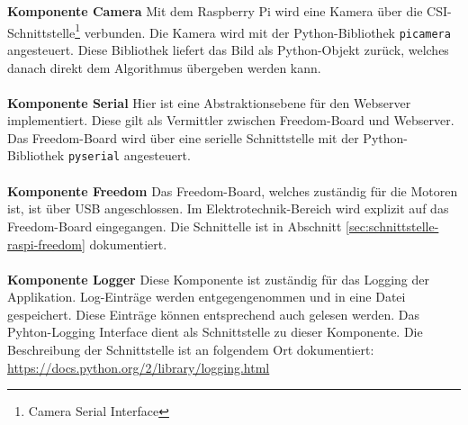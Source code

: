 \noindent
\textbf{Komponente Camera}
Mit dem Raspberry Pi wird eine Kamera über die CSI-Schnittstelle\footnote{Camera Serial Interface} verbunden. Die Kamera wird mit der Python-Bibliothek \texttt{picamera} angesteuert. Diese Bibliothek liefert das Bild als Python-Objekt zurück, welches danach direkt dem Algorithmus übergeben werden kann.
\\
\\
\textbf{Komponente Serial}
Hier ist eine Abstraktionsebene für den Webserver implementiert. Diese gilt als Vermittler zwischen Freedom-Board und Webserver. Das Freedom-Board wird über eine serielle Schnittstelle mit der Python-Bibliothek \texttt{pyserial} angesteuert.
\\
\\
\textbf{Komponente Freedom}
Das Freedom-Board, welches zuständig für die Motoren ist, ist über USB angeschlossen. Im Elektrotechnik-Bereich wird explizit auf das Freedom-Board eingegangen. Die Schnittelle ist in Abschnitt \ref{sec:schnittstelle-raspi-freedom} dokumentiert.
\\
\\
\textbf{Komponente Logger}
Diese Komponente ist zuständig für das Logging der Applikation. Log-Einträge werden entgegengenommen und in eine Datei gespeichert. Diese Einträge können entsprechend auch gelesen werden. Das Pyhton-Logging Interface dient als Schnittstelle zu dieser Komponente. Die Beschreibung der Schnittstelle ist an folgendem Ort dokumentiert: \href{https://docs.python.org/2/library/logging.html}{https://docs.python.org/2/library/logging.html}
